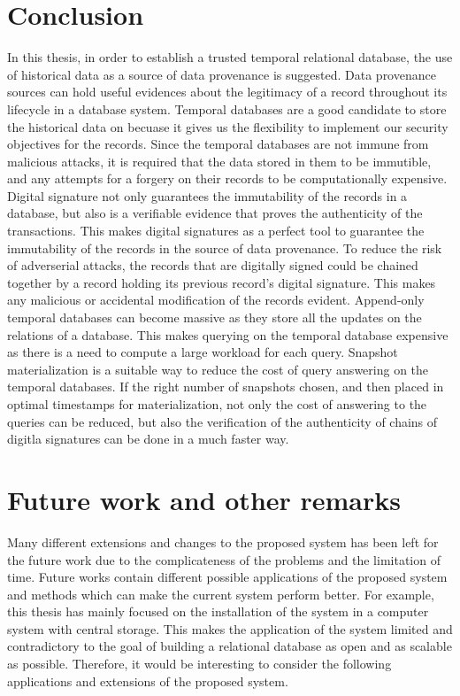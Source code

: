 	\section{Conclusion}
		In this thesis, in order to establish a trusted temporal relational database, the use of historical data as a source of data provenance is suggested. Data provenance sources can hold useful evidences about the legitimacy of a record throughout its lifecycle in a database system. Temporal databases are a good candidate to store the historical data on becuase it gives us the flexibility to implement our security objectives for the records. Since the temporal databases are not immune from malicious attacks, it is required that the data stored in them to be immutible, and any attempts for a forgery on their records to be computationally expensive. Digital signature not only guarantees the immutability of the records in a database, but also is a verifiable evidence that proves the authenticity of the transactions. This makes digital signatures as a perfect tool to guarantee the immutability of the records in the source of data provenance. To reduce the risk of adverserial attacks, the records that are digitally signed could be chained together by a record holding its previous record's digital signature. This makes any malicious or accidental modification of the records evident.
		Append-only temporal databases can become massive as they store all the updates on the relations of a database. This makes querying on the temporal database expensive as there is a need to compute a large workload for each query. Snapshot materialization is a suitable way to reduce the cost of query answering on the temporal databases. If the right number of snapshots chosen, and then placed in optimal timestamps for materialization, not only the cost of answering to the queries can be reduced, but also the verification of the authenticity of chains of digitla signatures can be done in a much faster way.

	\section{Future work and other remarks}
		Many different extensions and changes to the proposed system has been left for the future work due to the complicateness of the problems and the limitation of time. Future works contain different possible applications of the proposed system and methods which can make the current system perform better. For example, this thesis has mainly focused on the installation of the system in a computer system with central storage. This makes the application of the system limited and contradictory to the goal of building a relational database as open and as scalable as possible. Therefore, it would be interesting to consider the following applications and extensions of the proposed system.
